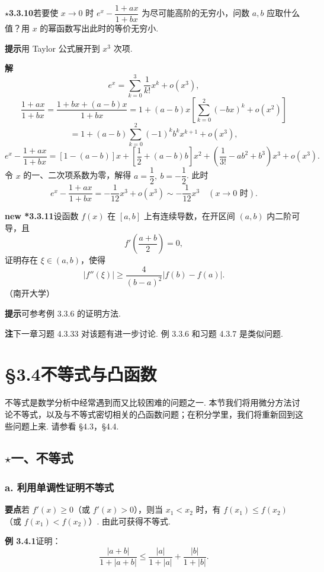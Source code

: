 \documentclass[UTF8, 12pt, fontset=fandol, oneside]{ctexart}
\begin{document}
\noindent\textbf{$\star$3.3.10}\quad 若要使 $x\to0$ 时 $e^x-\dfrac{1+ax}{1+bx}$ 为尽可能高阶的无穷小，问数 $a,b$ 应取什么值？用 $x$ 的幂函数写出此时的等价无穷小.

\noindent\textbf{提示}\quad 用 Taylor 公式展开到 $x^3$ 次项.

\noindent\textbf{解}\quad
\[
  e^x=\sum_{k=0}^3\frac1{k!}x^k+o(x^3),
\]
\[
  \frac{1+ax}{1+bx}=\frac{1+bx+(a-b)x}{1+bx}
  =1+(a-b)x\left[\sum_{k=0}^2(-bx)^k+o(x^2)\right]
\]
\[
  =1+(a-b)\sum_{k=0}^2(-1)^kb^kx^{k+1}+o(x^3),
\]
\[
  e^x-\frac{1+ax}{1+bx}
  =[1-(a-b)]x+\left[\frac12+(a-b)b\right]x^2
  +\left(\frac1{3!}-ab^2+b^3\right)x^3+o(x^3).
\]
令 $x$ 的一、二次项系数为零，解得 $a=\dfrac12,\ b=-\dfrac12$. 此时
\[
  e^x-\frac{1+ax}{1+bx}=-\frac1{12}x^3+o(x^3)\sim-\frac1{12}x^3\quad(x\to0\text{ 时}).
\]

\noindent\textbf{new *3.3.11}\quad 设函数 $f(x)$ 在 $[a,b]$ 上有连续导数，在开区间 $(a,b)$ 内二阶可导，且
\[
  f'\left(\frac{a+b}{2}\right)=0,
\]
证明存在 $\xi\in(a,b)$，使得
\[
  |f''(\xi)|\ge\frac4{(b-a)^2}|f(b)-f(a)|. \tag{1}
\]
（南开大学）

\noindent\textbf{提示}\quad 可参考例 3.3.6 的证明方法.

\noindent\textbf{注}\quad 下一章习题 4.3.33 对该题有进一步讨论. 例 3.3.6 和习题 4.3.7 是类似问题.

\section*{§3.4\quad 不等式与凸函数}

不等式是数学分析中经常遇到而又比较困难的问题之一. 本节我们将用微分方法讨论不等式，以及与不等式密切相关的凸函数问题；在积分学里，我们将重新回到这些问题上来. 请参看 §4.3，§4.4.

\subsection*{$\star$一、不等式}

\subsubsection*{a. 利用单调性证明不等式}

\noindent\textbf{要点}\quad 若 $f'(x)\ge0$（或 $f'(x)>0$），则当 $x_1<x_2$ 时，有 $f(x_1)\le f(x_2)$（或 $f(x_1)<f(x_2)$）. 由此可获得不等式.

\noindent\textbf{例 3.4.1}\quad 证明：
\[
  \frac{|a+b|}{1+|a+b|}\le \frac{|a|}{1+|a|}+\frac{|b|}{1+|b|}.
\]
\end{document}

